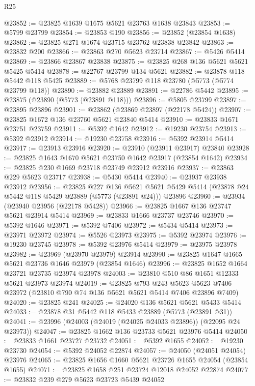 \begin{lexlean}{R25}
\begin{coremodule}
@23852 := @23825 @1639 @1675 @5621 @23763 @1638 @23843
@23853 := @5799 @23799
@23854 := @23853 @190
@23856 := @23852 (@23854 @1638)
@23862 := @23825 @271 @1674 @23715 @23762 @23838 @23842
@23863 := @23832 @200
@23866 := @23863 @270 @5623 @23714
@23867 := @5426 @5414
@23869 := @23866 @23867 @23838
@23875 := @23825 @268 @136 @5621 @5621 @5425 @5414
@23878 := @22767 @23799 @134 @5621
@23882 := @23878 @118 @5442 @118 @5425
@23889 := @5768 @23799 @118 @23780 (@5773 (@5774 @23799 @118))
@23890 := @23882 @23889
@23891 := @22786 @5442
@23895 := @23875 (@23890 (@5773 (@23891 @118)))
@23896 := @5805 @23799
@23897 := @23895 @23896
@23901 := @23862 (@23869 @23897 (@22178 @5424))
@23907 := @23825 @1672 @136 @23760 @5621 @23840 @5414
@23910 := @23833 @1671 @23751 @23759
@23911 := @5392 @1642
@23912 := @19230 @23754
@23913 := @5392 @23912
@23914 := @19230 @23758
@23916 := @5392 @23914 @5414
@23917 := @23913 @23916
@23920 := @23910 (@23911 @23917) @23840
@23928 := @23825 @1643 @1670 @5621 @23750 @1642 @23917 (@23854 @1642)
@23934 := @23825 @230 @1669 @23718 @23749 @23912 @23916
@23937 := @23863 @229 @5623 @23717
@23938 := @5430 @5414
@23940 := @23937 @23938 @23912
@23956 := @23825
    @227
    @136
    @5621
    @5621
    @5429
    @5414
    (@23878 @24 @5442 @118 @5429 @23889 (@5773 (@23891 @24)))
    @23896
@23960 := @23934 (@23940 @23956 (@22178 @5428))
@23966 := @23825 @1667 @136 @23747 @5621 @23914 @5414
@23969 := @23833 @1666 @23737 @23746
@23970 := @5392 @1646
@23971 := @5392 @7406
@23972 := @5434 @5414
@23973 := @23971 @23972
@23974 := @5526 @23973
@23975 := @5392 @23974
@23976 := @19230 @23745
@23978 := @5392 @23976 @5414
@23979 := @23975 @23978
@23982 := @23969 (@23970 @23979) @23914
@23990 := @23825 @1647 @1665 @5621 @23736 @1646 @23979 (@23854 @1646)
@23996 := @23825 @1652 @1664 @23721 @23735 @23974 @23978
@24003 := @23810 @510 @86 @1651 @12333 @5621 @23973 @23974
@24019 := @23825
    @793
    @243
    @5623
    @5623
    @7406
    @23972
    (@23810 @790 @74 @136 @5621 @5621 @5414 @7406 @23896 @7409)
@24020 := @23825 @241
@24025 := @24020 @136 @5621 @5621 @5433 @5414
@24033 := @23878 @31 @5442 @118 @5433 @23889 (@5773 (@23891 @31))
@24041 := @23996 (@24003 (@24019 (@24025 @24033 @23896)) (@22095 @24 @23973))
@24047 := @23825 @1662 @136 @23733 @5621 @23976 @5414
@24050 := @23833 @1661 @23727 @23732
@24051 := @5392 @1655
@24052 := @19230 @23730
@24054 := @5392 @24052 @22874
@24057 := @24050 (@24051 @24054) @23976
@24065 := @23825 @1656 @1660 @5621 @23726 @1655 @24054 (@23854 @1655)
@24071 := @23825 @1658 @251 @23724 @12018 @24052 @22874
@24077 := @23832 @239 @279 @5623 @23723 @5439 @24052

\end{coremodule}
\end{lexlean}
